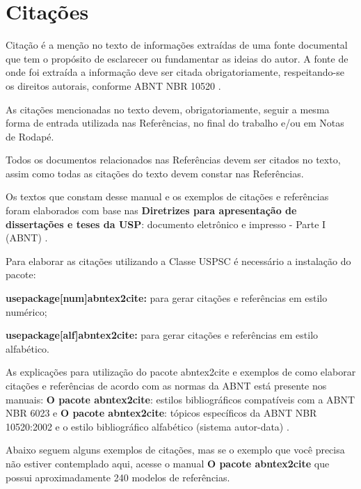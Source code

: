 

\chapter{Citações}
\label{Citações}
Citação é a menção no texto de informações extraídas de uma fonte documental que tem o propósito de esclarecer ou fundamentar as ideias do autor. A fonte de onde foi extraída a informação deve ser citada obrigatoriamente, respeitando-se os direitos autorais, conforme ABNT NBR 10520 \cite{nbr10520}.

As citações mencionadas no texto devem, obrigatoriamente, seguir a mesma forma de entrada utilizada nas Referências, no final do trabalho e/ou em Notas de Rodapé.

Todos os documentos relacionados nas Referências devem ser citados no texto, assim como todas as citações do texto devem constar nas Referências. 

Os textos que constam desse manual e os exemplos de citações e referências foram elaborados com base nas \textbf{Diretrizes para apresentação de dissertações e teses da USP}: documento eletrônico e impresso - Parte I (ABNT) \cite{sibi2016}.

Para elaborar as citações utilizando a Classe USPSC é necessário a instalação do pacote: 

\begin{alineas}
	\item \textbf{usepackage[num]abntex2cite:} para gerar citações e referências em estilo numérico;
	\item \textbf{usepackage[alf]abntex2cite:} para gerar citações e referências em estilo alfabético.
\end{alineas}

As explicações para utilização do pacote abntex2cite e exemplos de como elaborar citações e referências de acordo com as normas da ABNT está presente nos manuais: \textbf{O pacote abntex2cite}: estilos bibliográficos compatíveis com a ABNT NBR 6023 \cite{abnetxcite} e  \textbf{O pacote abntex2cite}: tópicos específicos da ABNT NBR 10520:2002 e o estilo bibliográfico alfabético (sistema autor-data) \cite{abnetxcitealf}.

Abaixo seguem alguns exemplos de citações, mas se o exemplo que você precisa não estiver contemplado aqui, acesse o manual \textbf{O pacote abntex2cite} que possui aproximadamente 240 modelos de referências.

